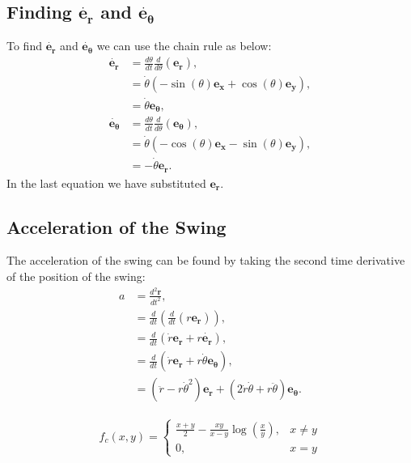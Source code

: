 \documentclass[12pt]{article}
\begin{document}
\subsection{Finding $\dot{\mathbf{e_r}}$ and $\dot{\mathbf{e_\theta}}$}
To find $\dot{\mathbf{e_r}}$ and $\dot{\mathbf{e_\theta}}$ we can use the chain rule as below:
\begin{align}
    \dot{\mathbf{e_r}} &= \frac{d\theta}{dt} \frac{d}{d\theta}(\mathbf{e_r}),\\
    &= \dot{\theta}(-\sin(\theta) \mathbf{e_x} + \cos(\theta) \mathbf{e_y}),\\
    &= \dot{\theta}\mathbf{e_\theta},\\
    \dot{\mathbf{e_\theta}} &= \frac{d\theta}{dt} \frac{d}{d\theta}(\mathbf{e_\theta}),\\
    &= \dot{\theta} (-\cos(\theta) \mathbf{e_x} - \sin(\theta) \mathbf{e_y}),\\
    &= -\dot{\theta} \mathbf{e_r}.
\end{align}
In the last equation we have substituted $\mathbf{e_r}$.
\subsection{Acceleration of the Swing}
The acceleration of the swing can be found by taking the second time derivative of the position of the swing:
\begin{align}
    a &= \frac{d^2\mathbf{r}}{dt^2},\\
    &= \frac{d}{dt}(\frac{d}{dt}(r\mathbf{e_r})),\\
    &= \frac{d}{dt}(\dot{r} \mathbf{e_r} + r\mathbf{\dot{e_r}}),\\
    &= \frac{d}{dt}(\dot{r} \mathbf{e_r} + r\dot{\theta}\mathbf{e_\theta}),\\
    &= (\ddot{r} - r \dot{\theta}^2) \mathbf{e_r} + (2\dot{r} \dot{\theta} + r \ddot{\theta}) \mathbf{e_\theta}.
\end{align}


\begin{align}
f_c(x,y) = 
    \begin{cases}
        \frac{x+y}{2}-\frac{xy}{x-y}\log{\left(\frac{x}{y}\right)}, & x\neq y\\
        0, & x = y
    \end{cases}
\end{align}
\end{document}
